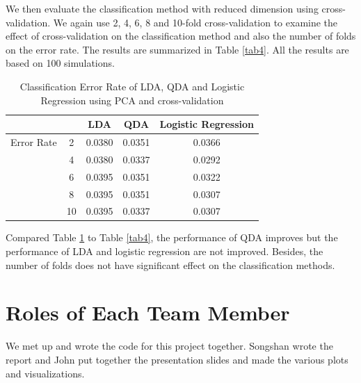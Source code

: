 \documentclass[12pt]{article}
\begin{document}
We then evaluate the classification method with reduced dimension using cross-validation. We again use 2, 4, 6, 8 and 10-fold cross-validation to examine the effect of cross-validation on the classification method and also the number of folds on the error rate. The results are summarized in Table \ref{tab4}. All the results are based on 100 simulations. 

\begin{table}[htbp]
	\begin{center}
		\caption{\label{tab5} Classification Error Rate of LDA, QDA and Logistic Regression using PCA and cross-validation}
		\begin{tabular}{c|c|ccc}
			\hline
			&&LDA &QDA &Logistic Regression \\
			\hline
     Error Rate& 2&0.0380 &0.0351 &0.0366  \\
			\hline
			&4 &0.0380 &0.0337 &0.0292 \\
				\hline
		&6 &0.0395 &0.0351 &0.0322  \\
			\hline
		&8 &0.0395 &0.0351 &0.0307  \\
			\hline
	   &10 &0.0395 &0.0337 &0.0307  \\
			\hline
		\end{tabular}
	\end{center}
\end{table}

Compared Table \ref{tab5} to Table \ref{tab4}, the performance of QDA improves but the performance of LDA and logistic regression are not improved. Besides, the number of folds does not have significant effect on the classification methods.

\section{Roles of Each Team Member}

We met up and wrote the code for this project together. Songshan wrote the report and John put together the presentation slides and made the various plots and visualizations.
\end{document}
